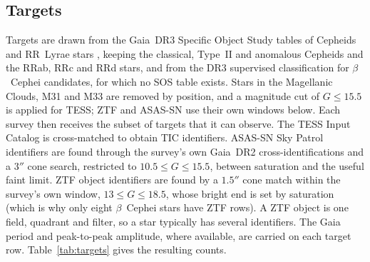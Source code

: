 \documentclass[final,5p]{elsarticle}
\newcommand{\bcep}{\ensuremath{\beta}~Cephei}
\begin{document}
\subsection{Targets}
\label{sec:targets}

Targets are drawn from the Gaia~DR3 Specific Object Study tables of Cepheids \citep{Ripepi2023} and RR~Lyrae stars \citep{Clementini2023}, keeping the classical, Type~II and anomalous Cepheids and the RRab, RRc and RRd stars, and from the DR3 supervised classification \citep{Rimoldini2023} for \bcep{} candidates, for which no SOS table exists. Stars in the Magellanic Clouds, M31 and M33 are removed by position, and a magnitude cut of $G\le15.5$ is applied for TESS; ZTF and ASAS-SN use their own windows below. Each survey then receives the subset of targets that it can observe. The TESS Input Catalog \citep{Stassun2019} is cross-matched to obtain TIC identifiers. ASAS-SN Sky Patrol identifiers \citep{Kochanek2017, Hart2023} are found through the survey's own Gaia~DR2 cross-identifications and a $3''$ cone search, restricted to $10.5\le G\le15.5$, between saturation and the useful faint limit. ZTF object identifiers \citep{Bellm2019, Masci2019} are found by a $1.5''$ cone match within the survey's own window, $13\le G\le18.5$, whose bright end is set by saturation (which is why only eight \bcep{} stars have ZTF rows). A ZTF object is one field, quadrant and filter, so a star typically has several identifiers. The Gaia period and peak-to-peak amplitude, where available, are carried on each target row. Table~\ref{tab:targets} gives the resulting counts.
\end{document}
